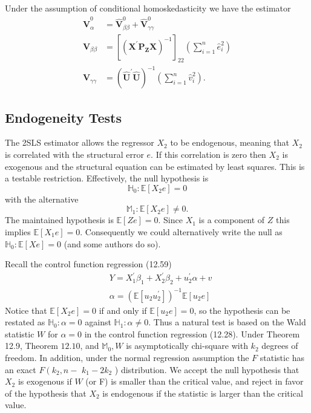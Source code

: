 \documentclass[10pt]{article}
\begin{document}
Under the assumption of conditional homoskedasticity we have the estimator
$$
\begin{aligned}
\widehat{\boldsymbol{V}}_{\alpha}^{0} &=\widehat{\boldsymbol{V}}_{\beta \beta}^{0}+\widehat{\boldsymbol{V}}_{\gamma \gamma}^{0} \\
\widehat{\boldsymbol{V}}_{\beta \beta} &=\left[\left(\boldsymbol{X}^{\prime} \boldsymbol{P}_{\boldsymbol{Z}} \boldsymbol{X}\right)^{-1}\right]_{22}\left(\sum_{i=1}^{n} \widehat{e}_{i}^{2}\right) \\
\widehat{\boldsymbol{V}}_{\gamma \gamma} &=\left(\widehat{\boldsymbol{U}}^{\prime} \widehat{\boldsymbol{U}}\right)^{-1}\left(\sum_{i=1}^{n} \widehat{v}_{i}^{2}\right) .
\end{aligned}
$$

\subsection{Endogeneity Tests}
The 2SLS estimator allows the regressor $X_{2}$ to be endogenous, meaning that $X_{2}$ is correlated with the structural error $e$. If this correlation is zero then $X_{2}$ is exogenous and the structural equation can be estimated by least squares. This is a testable restriction. Effectively, the null hypothesis is
$$
\mathbb{H}_{0}: \mathbb{E}\left[X_{2} e\right]=0
$$
with the alternative
$$
\mathbb{M}_{1}: \mathbb{E}\left[X_{2} e\right] \neq 0 .
$$
The maintained hypothesis is $\mathbb{E}[Z e]=0$. Since $X_{1}$ is a component of $Z$ this implies $\mathbb{E}\left[X_{1} e\right]=0$. Consequently we could alternatively write the null as $\mathbb{H}_{0}: \mathbb{E}[X e]=0$ (and some authors do so).

Recall the control function regression (12.59)
$$
\begin{aligned}
&Y=X_{1}^{\prime} \beta_{1}+X_{2}^{\prime} \beta_{2}+u_{2}^{\prime} \alpha+v \\
&\alpha=\left(\mathbb{E}\left[u_{2} u_{2}^{\prime}\right]\right)^{-1} \mathbb{E}\left[u_{2} e\right]
\end{aligned}
$$
Notice that $\mathbb{E}\left[X_{2} e\right]=0$ if and only if $\mathbb{E}\left[u_{2} e\right]=0$, so the hypothesis can be restated as $\mathbb{H}_{0}: \alpha=0$ against $\mathbb{H}_{1}: \alpha \neq 0$. Thus a natural test is based on the Wald statistic $W$ for $\alpha=0$ in the control function regression (12.28). Under Theorem 12.9, Theorem $12.10$, and $\mathbb{M}_{0}, W$ is asymptotically chi-square with $k_{2}$ degrees of freedom. In addition, under the normal regression assumption the $F$ statistic has an exact $F\left(k_{2}, n-\right.$ $k_{1}-2 k_{2}$ ) distribution. We accept the null hypothesis that $X_{2}$ is exogenous if $W$ (or F) is smaller than the critical value, and reject in favor of the hypothesis that $X_{2}$ is endogenous if the statistic is larger than the critical value.
\end{document}
